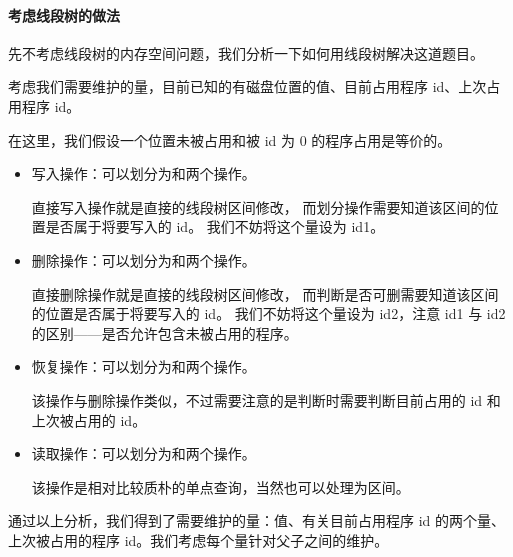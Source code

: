 \paragraph{考虑线段树的做法}

先不考虑线段树的内存空间问题，我们分析一下如何用线段树解决这道题目。

考虑我们需要维护的量，目前已知的有磁盘位置的值、目前占用程序 id、上次占用程序 id。

在这里，我们假设一个位置未被占用和被 id 为 0 的程序占用是等价的。

\begin{itemize}
    \item 写入操作：可以划分为{}和{}两个操作。

          直接写入操作就是直接的线段树区间修改，
          而划分操作需要知道该区间{}的位置是否属于将要写入的 id。
          我们不妨将这个量设为 id1。

    \item 删除操作：可以划分为{}和{}两个操作。

          直接删除操作就是直接的线段树区间修改，
          而判断是否可删需要知道该区间{}的位置是否属于将要写入的 id。
          我们不妨将这个量设为 id2，注意 id1 与 id2 的区别——是否允许包含未被占用的程序。

    \item 恢复操作：可以划分为{}和{}两个操作。

          该操作与删除操作类似，不过需要注意的是判断时需要判断目前占用的 id 和上次被占用的 id。

    \item 读取操作：可以划分为{}和{}两个操作。

          该操作是相对比较质朴的单点查询，当然也可以处理为区间。

\end{itemize}

通过以上分析，我们得到了需要维护的量：值、有关目前占用程序 id 的两个量、上次被占用的程序 id。我们考虑每个量针对父子之间的维护。

